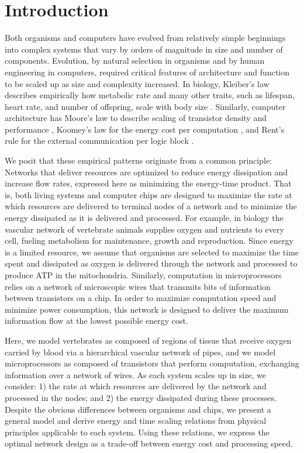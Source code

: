 \documentclass[12pt]{article}
\begin{document}
\newpage

\section{Introduction}
\label{sec:intro}

Both organisms and computers have evolved from relatively simple beginnings
into complex systems that vary by orders of magnitude in size and number of
components. Evolution, by natural selection in organisms and by human
engineering in computers, required critical features of architecture and
function to be scaled up as size and complexity increased. In biology,
Kleiber's law describes empirically how metabolic rate and many
other traits, such as lifespan, heart rate, and number of offspring, scale with body
size \cite{kleiber47}.  Similarly, computer architecture has Moore's law to
describe scaling of transistor density and performance \cite{moore98}, Koomey's
law for the energy cost per computation \cite{koomey11}, and Rent's rule for
the external communication per logic block \cite{christie00}.

We posit that these empirical patterns originate from a common principle:
Networks that deliver resources are optimized to reduce energy dissipation and
increase flow rates, expressed here as minimizing the energy-time product. That
is, both living systems and computer chips are designed to maximize the rate at
which resources are delivered to terminal nodes of a network and to minimize
the energy dissipated as it is delivered and processed.  For example, in biology the vascular network of vertebrate
animals supplies oxygen and nutrients to every cell, fueling metabolism for
maintenance, growth and reproduction.  Since energy is a limited resource, we
assume that organisms are selected to maximize the time spent and dissipated as oxygen is delivered through the network \cite{west97} and processed to produce ATP in the mitochondria. Similarly, computation in microprocessors relies on a
network of microscopic wires that transmits bits of information between
transistors on a chip.  In order to maximize computation speed and minimize
power consumption, this network is designed to deliver the maximum information
flow at the lowest possible energy cost.

Here, we model vertebrates as composed of regions of tissue that receive oxygen
carried by blood via a hierarchical vascular network of pipes, and we model
microprocessors as composed of transistors that perform computation, exchanging
information over a network of wires.  As each system scales up in size,
we consider: 1) the rate at which resources are delivered by the network and
processed in the nodes; and 2) the energy dissipated during these processes.
Despite the obvious differences between organisms and chips, we present a
general model and derive energy and time scaling relations from physical
principles applicable to each system. Using these relations, we express the
optimal network design as a trade-off between energy cost and processing speed. 
\end{document}
